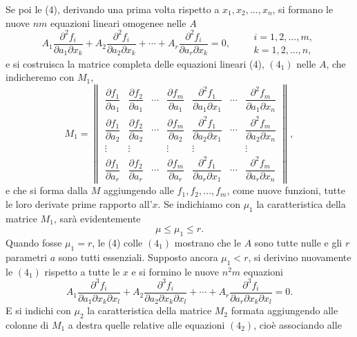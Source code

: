\documentclass[11pt]{book}
\begin{document}
Se poi le (4), derivando una prima volta rispetto a $x_1,x_2,\ldots,x_n$, si formano le nuove $nm$ equazioni lineari omogenee nelle $A$
\begin{equation*}\tag{$4_1$}
 A_1\frac{\partial^2 f_i}{\partial a_1\partial x_k}+A_2\frac{\partial^2 f_i}{\partial a_2\partial x_k}+\cdots+A_r\frac{\partial^2 f_i}{\partial a_r\partial x_k}=0,
 \qquad\begin{gathered} i=1,2,\ldots,m,\\ k=1,2,\ldots,n,\end{gathered}
\end{equation*}
e si costruisca la matrice completa delle equazioni lineari (4), $(4_1)$ nelle $A$, che indicheremo con $M_1$,
\[
M_1=\left\|\begin{array}{ccccccc}
\dfrac{\partial f_1}{\partial a_1}&\dfrac{\partial f_2}{\partial a_1}&\cdots&\dfrac{\partial f_m}{\partial a_1}&
\dfrac{\partial^2 f_1}{\partial a_1\partial x_1}&\cdots&\dfrac{\partial^2 f_m}{\partial a_1\partial x_n}\\[0.65em]
\dfrac{\partial f_1}{\partial a_2}&\dfrac{\partial f_2}{\partial a_2}&\cdots&\dfrac{\partial f_m}{\partial a_2}&
\dfrac{\partial^2 f_1}{\partial a_2\partial x_1}&\cdots&\dfrac{\partial^2 f_m}{\partial a_2\partial x_n}\\
\vdots&\vdots&&\vdots&\vdots&&\vdots\\
\dfrac{\partial f_1}{\partial a_r}&\dfrac{\partial f_2}{\partial a_r}&\cdots&\dfrac{\partial f_m}{\partial a_r}&
\dfrac{\partial^2 f_1}{\partial a_r\partial x_1}&\cdots&\dfrac{\partial^2 f_m}{\partial a_r\partial x_n}
\end{array}\right\|,
\]
e che si forma dalla $M$ aggiungendo alle $f_1,f_2,\ldots,f_m$, come nuove funzioni, tutte le loro derivate prime rapporto all'$x$. Se indichiamo con $\mu_1$ la caratteristica della matrice $M_1$, sarà evidentemente
\[
 \mu\le \mu_1\le r.
\]
Quando fosse $\mu_1=r$, le (4) colle $(4_1)$ mostrano che le $A$ sono tutte nulle e gli $r$ parametri $a$ sono tutti essenziali. Supposto ancora $\mu_1<r$, si derivino nuovamente le $(4_1)$ rispetto a tutte le $x$ e si formino le nuove $n^2m$ equazioni
\begin{equation*}\tag{$4_2$}
 A_1\frac{\partial^3 f_i}{\partial a_1\partial x_k\partial x_l}+A_2\frac{\partial^3 f_i}{\partial a_2\partial x_k\partial x_l}+\cdots+A_r\frac{\partial^3 f_i}{\partial a_r\partial x_k\partial x_l}=0.
\end{equation*}
E si indichi con $\mu_2$ la caratteristica della matrice $M_2$ formata aggiungendo alle colonne di $M_1$ a destra quelle relative alle equazioni $(4_2)$, cioè associando alle
\end{document}
